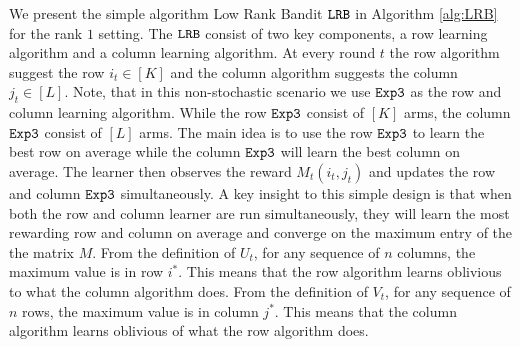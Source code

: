 


%

We present the simple algorithm Low Rank Bandit ${\tt LRB}$ in Algorithm \ref{alg:LRB} for the rank $1$ setting. The ${\tt LRB}$ consist of two key components, a row learning algorithm and a column learning algorithm. At every round $t$ the row algorithm suggest the row $i_t\in [K]$ and the column algorithm suggests the column $j_t\in [L]$. Note, that in this non-stochastic scenario we use ${\tt Exp3}$ as the row and column learning algorithm. While the row ${\tt Exp3}$ consist of $[K]$ arms, the column ${\tt Exp3}$ consist of $[L]$ arms. The main idea is to use the row ${\tt Exp3}$ to learn the best row on average while the column ${\tt Exp3}$ will learn the best column on average. The learner then observes the reward $M_t(i_t, j_t)$ and updates the row and column ${\tt Exp3}$ simultaneously. A key insight to this simple design is that when both the row and column learner are run simultaneously, they will learn the most rewarding row and column on average and converge on the maximum entry of the the matrix $M$. From the definition of $U_t$, for any sequence of $n$ columns, the maximum value is in row $i^\ast$. This means that the row algorithm learns oblivious to what the column algorithm does. From the definition of $V_t$, for any sequence of $n$ rows, the maximum value is in column $j^\ast$. This means that the column algorithm learns oblivious of what the row algorithm does.


